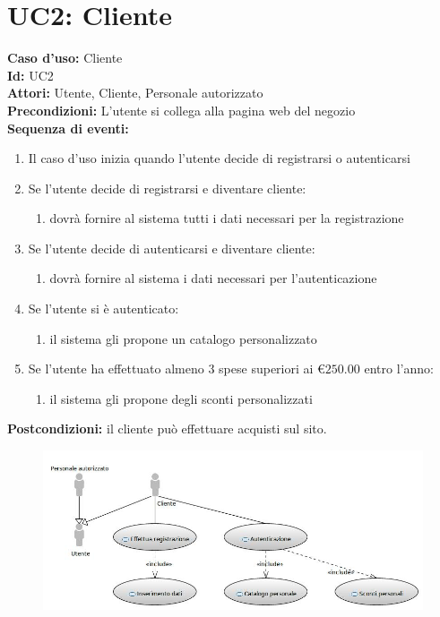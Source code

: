 \documentclass[a4paper,12pt]{report}
\begin{document}
	\newpage
	\section*{UC2: Cliente}
	\noindent
	\textbf{Caso d'uso:} Cliente\\
	\textbf{Id:} UC2\\
	\textbf{Attori:} Utente, Cliente, Personale autorizzato\\
	\textbf{Precondizioni:} L'utente si collega alla pagina web del negozio\\
	\textbf{Sequenza di eventi:}
	\begin{enumerate} 
		\item Il caso d'uso inizia quando l'utente decide di registrarsi o autenticarsi
		\item Se l'utente decide di registrarsi e diventare cliente:
		\begin{enumerate}
			\item dovrà fornire al sistema tutti i dati necessari per la registrazione
		\end{enumerate}
		\item Se l'utente decide di autenticarsi e diventare cliente:
		\begin{enumerate}
			\item dovrà fornire al sistema i dati necessari per l'autenticazione
		\end{enumerate}
		\item Se l'utente si è autenticato:
		\begin{enumerate}
			\item il sistema gli propone un catalogo personalizzato
		\end{enumerate}
		\item Se l'utente ha effettuato almeno 3 spese superiori ai \euro$250.00$ entro l'anno:
		\begin{enumerate}
			\item il sistema gli propone degli sconti personalizzati
		\end{enumerate}
	\end{enumerate}
	\textbf{Postcondizioni:} il cliente può effettuare acquisti sul sito.
	
	\begin{figure}[h]
		\centering
		\includegraphics[width=\textwidth]{Cliente}
	\end{figure}
	
\end{document}
